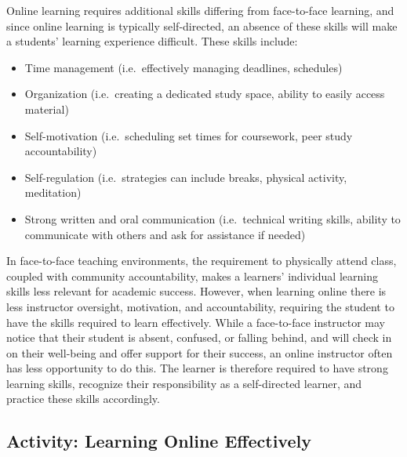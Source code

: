 \documentclass[
]{book}
\providecommand{\tightlist}{%
  \setlength{\itemsep}{0pt}\setlength{\parskip}{0pt}}
\theoremstyle{definition}
\theoremstyle{definition}
\theoremstyle{definition}
\theoremstyle{definition}
\theoremstyle{remark}
\begin{document}
Online learning requires additional skills differing from face-to-face learning, and since online learning is typically self-directed, an absence of these skills will make a students' learning experience difficult. These skills include:

\begin{itemize}
\tightlist
\item
  Time management (i.e.~effectively managing deadlines, schedules)\\
\item
  Organization (i.e.~creating a dedicated study space, ability to easily access material)\\
\item
  Self-motivation (i.e.~scheduling set times for coursework, peer study accountability)\\
\item
  Self-regulation (i.e.~strategies can include breaks, physical activity, meditation)\\
\item
  Strong written and oral communication (i.e.~technical writing skills, ability to communicate with others and ask for assistance if needed)
\end{itemize}

In face-to-face teaching environments, the requirement to physically attend class, coupled with community accountability, makes a learners' individual learning skills less relevant for academic success. However, when learning online there is less instructor oversight, motivation, and accountability, requiring the student to have the skills required to learn effectively. While a face-to-face instructor may notice that their student is absent, confused, or falling behind, and will check in on their well-being and offer support for their success, an online instructor often has less opportunity to do this. The learner is therefore required to have strong learning skills, recognize their responsibility as a self-directed learner, and practice these skills accordingly.

\hypertarget{activity-learning-online-effectively}{%
\subsection*{Activity: Learning Online Effectively}\label{activity-learning-online-effectively}}
\end{document}
